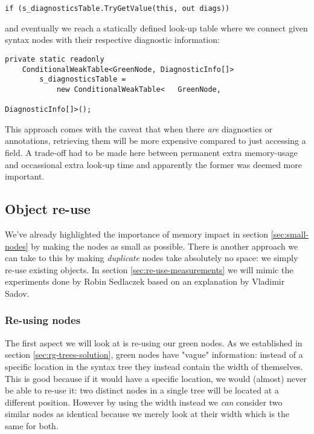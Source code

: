 \begin{lstlisting}
if (s_diagnosticsTable.TryGetValue(this, out diags))
\end{lstlisting}

\noindent and eventually we reach a statically defined look-up table where we connect given syntax nodes with their respective diagnostic information:

\begin{lstlisting}
private static readonly 
	ConditionalWeakTable<GreenNode, DiagnosticInfo[]> 
		s_diagnosticsTable =
			new ConditionalWeakTable<	GreenNode, 
																DiagnosticInfo[]>();
\end{lstlisting}

This approach comes with the caveat that when there \textit{are} diagnostics or annotations, retrieving them will be more expensive compared to just accessing a field. A trade-off had to be made here between permanent extra memory-usage and occassional extra look-up time and apparently the former was deemed more important.

\subsection{Object re-use}
\label{sec:object-reuse}

We've already highlighted the importance of memory impact in section \ref{sec:small-nodes} by making the nodes as small as possible. There is another approach we can take to this by making \textit{duplicate} nodes take absolutely no space: we simply re-use existing objects. In section \ref{sec:re-use-measurements} we will mimic the experiments done by Robin Sedlaczek\parencite{Sedlaczek2015} based on an explanation by Vladimir Sadov\parencite{Sadov2014}.

\subsubsection{Re-using nodes}
\label{sec:re-use-nodes}

The first aspect we will look at is re-using our green nodes. As we established in section \ref{sec:rg-trees-solution}, green nodes have "vague" information: instead of a specific location in the syntax tree they instead contain the width of themselves. This is good because if it would have a specific location, we would (almost) never be able to re-use it: two distinct nodes in a single tree will be located at a different position. However by using the width instead we \textit{can} consider two similar nodes as identical because we merely look at their width which is the same for both.

